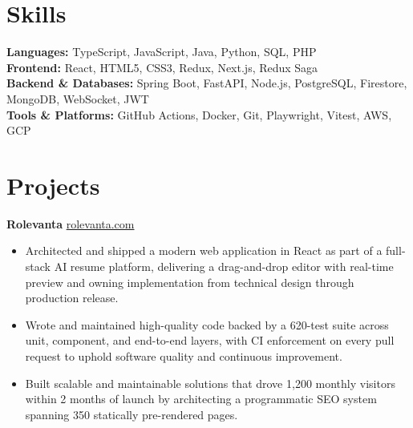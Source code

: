 \documentclass[11pt]{article}       %
\begin{document}
\vspace{-10.5pt}

\section*{Skills}
\textbf{Languages:} TypeScript, JavaScript, Java, Python, SQL, PHP \\
\textbf{Frontend:} React, HTML5, CSS3, Redux, Next.js, Redux Saga \\
\textbf{Backend \& Databases:} Spring Boot, FastAPI, Node.js, PostgreSQL, Firestore, MongoDB, WebSocket, JWT \\
\textbf{Tools \& Platforms:} GitHub Actions, Docker, Git, Playwright, Vitest, AWS, GCP
\vspace{-5pt}






\section*{Projects}
\textbf{Rolevanta} \hfill \href{https://rolevanta.com}{rolevanta.com} \\
\vspace{-9pt}
\begin{itemize}
  \item Architected and shipped a modern web application in React as part of a full-stack AI resume platform, delivering a drag-and-drop editor with real-time preview and owning implementation from technical design through production release.
  \item Wrote and maintained high-quality code backed by a 620-test suite across unit, component, and end-to-end layers, with CI enforcement on every pull request to uphold software quality and continuous improvement.
  \item Built scalable and maintainable solutions that drove 1,200 monthly visitors within 2 months of launch by architecting a programmatic SEO system spanning 350 statically pre-rendered pages.
\end{itemize}
\end{document}
